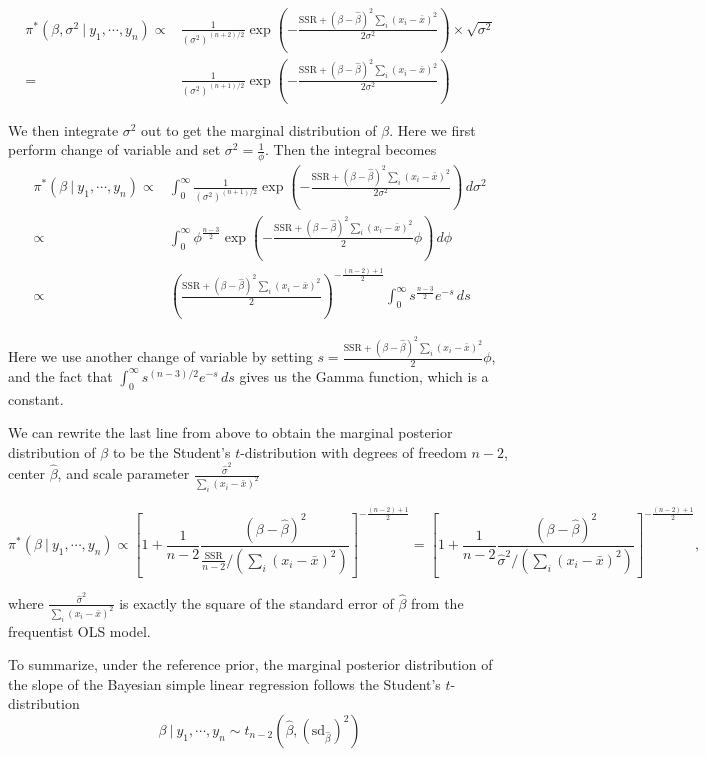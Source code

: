 \documentclass[]{book}
\theoremstyle{definition}
\theoremstyle{definition}
\theoremstyle{definition}
\theoremstyle{remark}
\begin{document}
\[
\begin{aligned}
\pi^*(\beta, \sigma^2~|~y_1,\cdots,y_n) 
\propto & \frac{1}{(\sigma^2)^{(n+2)/2}}\exp\left(-\frac{\text{SSR}+(\beta-\hat{\beta})^2\sum_i(x_i-\bar{x})^2}{2\sigma^2}\right) \times \sqrt{\sigma^2}\\
= & \frac{1}{(\sigma^2)^{(n+1)/2}}\exp\left(-\frac{\text{SSR}+(\beta-\hat{\beta})^2\sum_i (x_i-\bar{x})^2}{2\sigma^2}\right)
\end{aligned}
\]

We then integrate \(\sigma^2\) out to get the marginal distribution of
\(\beta\). Here we first perform change of variable and set
\(\sigma^2 = \frac{1}{\phi}\). Then the integral becomes \[
\begin{aligned}
\pi^*(\beta~|~y_1,\cdots, y_n) \propto & \int_0^\infty \frac{1}{(\sigma^2)^{(n+1)/2}}\exp\left(-\frac{\text{SSR} + (\beta-\hat{\beta})^2\sum_i(x_i-\bar{x})^2}{2\sigma^2}\right)\, d\sigma^2 \\
\propto & \int_0^\infty \phi^{\frac{n-3}{2}}\exp\left(-\frac{\text{SSR}+(\beta-\hat{\beta})^2\sum_i(x_i-\bar{x})^2}{2}\phi\right)\, d\phi\\
\propto & \left(\frac{\text{SSR}+(\beta-\hat{\beta})^2\sum_i(x_i-\bar{x})^2}{2}\right)^{-\frac{(n-2)+1}{2}}\int_0^\infty s^{\frac{n-3}{2}}e^{-s}\, ds
\end{aligned}
\]

Here we use another change of variable by setting
\(\displaystyle s= \frac{\text{SSR}+(\beta-\hat{\beta})^2\sum_i(x_i-\bar{x})^2}{2}\phi\),
and the fact that \(\displaystyle \int_0^\infty s^{(n-3)/2}e^{-s}\, ds\)
gives us the Gamma function, which is a constant.

We can rewrite the last line from above to obtain the marginal posterior
distribution of \(\beta\) to be the Student's \(t\)-distribution with
degrees of freedom \(n-2\), center \(\hat{\beta}\), and scale parameter
\(\displaystyle \frac{\hat{\sigma}^2}{\sum_i(x_i-\bar{x})^2}\)

\[ \pi^*(\beta~|~y_1,\cdots,y_n) \propto
 \left[1+\frac{1}{n-2}\frac{(\beta - \hat{\beta})^2}{\frac{\text{SSR}}{n-2}/(\sum_i (x_i-\bar{x})^2)}\right]^{-\frac{(n-2)+1}{2}} = \left[1 + \frac{1}{n-2}\frac{(\beta - \hat{\beta})^2}{\hat{\sigma}^2/(\sum_i (x_i-\bar{x})^2)}\right]^{-\frac{(n-2)+1}{2}},
\]

where \(\displaystyle \frac{\hat{\sigma}^2}{\sum_i (x_i-\bar{x})^2}\) is
exactly the square of the standard error of \(\hat{\beta}\) from the
frequentist OLS model.

To summarize, under the reference prior, the marginal posterior
distribution of the slope of the Bayesian simple linear regression
follows the Student's \(t\)-distribution \[ 
\beta ~|~y_1,\cdots, y_n \sim t_{n-2}\left(\hat{\beta}, \left(\text{sd}_{\hat{\beta}}\right)^2\right) 
\]
\end{document}
